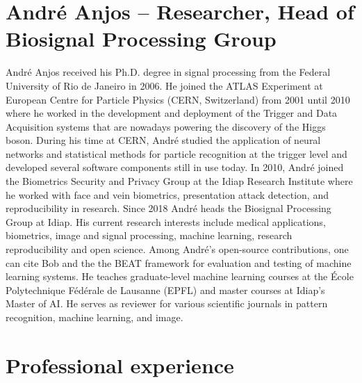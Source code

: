 \documentclass[11pt,a4paper,sans]{moderncv}
\begin{document}
\section{André Anjos -- Researcher, Head of Biosignal Processing Group}

André Anjos received his Ph.D. degree in signal processing from the Federal
University of Rio de Janeiro in 2006. He joined the ATLAS Experiment at
European Centre for Particle Physics (CERN, Switzerland) from 2001 until 2010
where he worked in the development and deployment of the Trigger and Data
Acquisition systems that are nowadays powering the discovery of the Higgs
boson. During his time at CERN, André studied the application of neural
networks and statistical methods for particle recognition at the trigger level
and developed several software components still in use today. In 2010, André
joined the Biometrics Security and Privacy Group at the Idiap Research
Institute where he worked with face and vein biometrics, presentation attack
detection, and reproducibility in research. Since 2018 André heads the
Biosignal Processing Group at Idiap. His current research interests include
medical applications, biometrics, image and signal processing, machine
learning, research reproducibility and open science. Among André's open-source
contributions, one can cite Bob and the the BEAT framework for evaluation and
testing of machine learning systems. He teaches graduate-level machine learning
courses at the École Polytechnique Fédérale de Lausanne (EPFL) and master
courses at Idiap's Master of AI. He serves as reviewer for various scientific
journals in pattern recognition, machine learning, and image.



\section{Professional experience}




\end{document}
